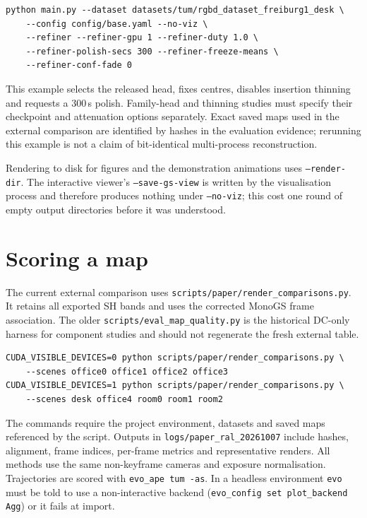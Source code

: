 \begin{small}
\begin{verbatim}
python main.py --dataset datasets/tum/rgbd_dataset_freiburg1_desk \
    --config config/base.yaml --no-viz \
    --refiner --refiner-gpu 1 --refiner-duty 1.0 \
    --refiner-polish-secs 300 --refiner-freeze-means \
    --refiner-conf-fade 0
\end{verbatim}
\end{small}

\noindent
This example selects the released head, fixes centres, disables insertion
thinning and requests a 300\,s polish. Family-head and thinning studies
must specify their checkpoint and attenuation options separately. Exact
saved maps used in the external comparison are identified by hashes in the
evaluation evidence; rerunning this example is not a claim of bit-identical
multi-process reconstruction.

Rendering to disk for figures and the demonstration animations uses
\texttt{--render-dir}. The interactive viewer's \texttt{--save-gs-view} is
written by the visualisation process and therefore produces nothing under
\texttt{--no-viz}; this cost one round of empty output directories before it
was understood.

\section{Scoring a map}

The current external comparison uses
\texttt{scripts/paper/render\_comparisons.py}. It retains all exported SH
bands and uses the corrected MonoGS frame association. The older
\texttt{scripts/eval\_map\_quality.py} is the historical DC-only harness
for component studies and should not regenerate the fresh external table.

\begin{small}
\begin{verbatim}
CUDA_VISIBLE_DEVICES=0 python scripts/paper/render_comparisons.py \
    --scenes office0 office1 office2 office3
CUDA_VISIBLE_DEVICES=1 python scripts/paper/render_comparisons.py \
    --scenes desk office4 room0 room1 room2
\end{verbatim}
\end{small}

The commands require the project environment, datasets and saved maps
referenced by the script. Outputs in \texttt{logs/paper\_ral\_20261007}
include hashes, alignment, frame indices, per-frame metrics and representative
renders. All methods use the same non-keyframe cameras and exposure
normalisation. Trajectories are scored with \texttt{evo\_ape tum -as}. In a headless
environment \texttt{evo} must be told to use a non-interactive backend
(\texttt{evo\_config set plot\_backend Agg}) or it fails at import.

